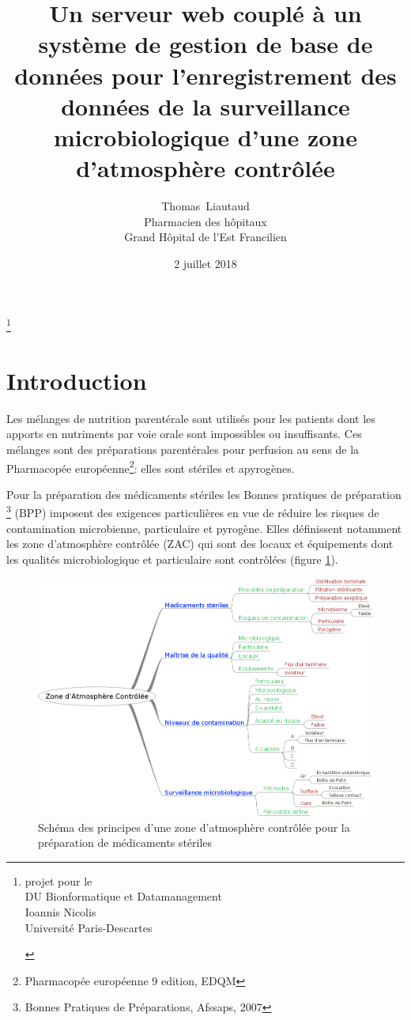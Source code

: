 \documentclass[12pt,a4paper,oneside]{article}
\author{Thomas~Liautaud\\Pharmacien des hôpitaux\\Grand Hôpital de l'Est Francilien}
\date{2 juillet 2018}
\title{Un serveur web couplé à un système de gestion de base de données pour l'enregistrement des données de la surveillance microbiologique d'une zone d'atmosphère contrôlée}
\begin{document}
\maketitle
\thanks{\begin{center}
projet pour le \\DU Bionformatique et Datamanagement\\ Ioannis Nicolis\\Université Paris-Descartes
\end{center}}
\tableofcontents
\section{Introduction}
Les mélanges de nutrition parentérale sont utilisés pour les patients dont les apports en nutriments par voie orale sont impossibles ou insuffisants. Ces mélanges sont des préparations parentérales pour perfusion au sens de la Pharmacopée européenne\footnote{Pharmacopée européenne 9 edition, EDQM}: elles sont stériles et apyrogènes.

Pour la préparation des médicaments stériles les Bonnes pratiques de préparation \footnote{Bonnes Pratiques de Préparations, Afssaps, 2007} (BPP) imposent des  exigences  particulières en vue de réduire les risques de contamination microbienne, particulaire et pyrogène. Elles définissent notamment les zone d'atmosphère contrôlée (ZAC) qui sont des locaux et équipements dont les qualités microbiologique et particulaire sont contrôlées (figure \ref{zac}).

\begin{figure}[h]
\caption{\label{zac}Schéma des principes d'une zone d'atmosphère contrôlée pour la préparation de médicaments stériles}
\includegraphics[scale=0.4]{zac.png}
\end{figure}
\end{document}
